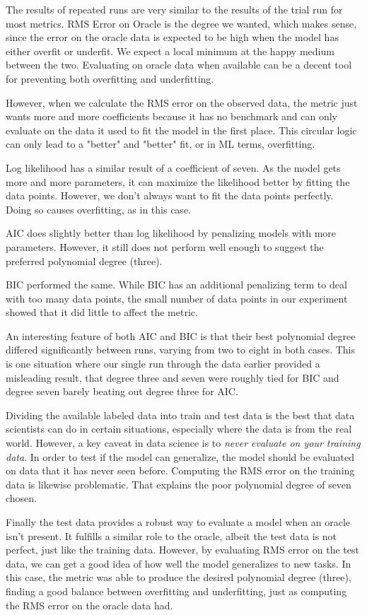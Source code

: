 \documentclass{article}
\begin{document}
The results of repeated runs are very similar to the results of the trial run
for most metrics. RMS Error on Oracle is the degree we wanted, which makes 
sense, since the error on the oracle data is expected to be high when the model 
has either overfit or underfit. We expect a local minimum at the happy medium 
between the two. Evaluating on oracle data when available can be a decent tool 
for preventing both overfitting and underfitting.

However, when we calculate the RMS error on the observed data, the metric just 
wants more and more coefficients because it has no benchmark and can only 
evaluate on the data it used to fit the model in the first place. This circular 
logic can only lead to a "better" and "better" fit, or in ML terms, overfitting.

Log likelihood has a similar result of a coefficient of seven. As the model 
gets more and more parameters, it can maximize the likelihood better by fitting 
the data points. However, we don't always want to fit the data points perfectly.
Doing so causes overfitting, as in this case.

AIC does slightly better than log likelihood by penalizing models with more 
parameters. However, it still does not perform well enough to suggest the 
preferred polynomial degree (three).

BIC performed the same. While BIC has an additional penalizing term to deal 
with too many data points, the small number of data points in our experiment 
showed that it did little to affect the metric.

An interesting feature of both AIC and BIC is that their best polynomial degree 
differed significantly between runs, varying from two to eight in both cases. 
This is one situation where our single run through the data earlier provided 
a misleading result, that degree three and seven were roughly tied for BIC and 
degree seven barely beating out degree three for AIC.

Dividing the available labeled data into train and test data is the best that 
data scientists can do in certain situations, especially where the data is 
from the real world. However, a key caveat in data science is to \textit{never 
evaluate on your training data}. In order to test if the model can generalize, 
the model should be evaluated on data that it has never seen before. Computing 
the RMS error on the training data is likewise problematic. That explains the 
poor polynomial degree of seven chosen.

Finally the test data provides a robust way to evaluate a model when an oracle 
isn't present. It fulfills a similar role to the oracle, albeit the test data 
is not perfect, just like the training data. However, by evaluating RMS error 
on the test data, we can get a good idea of how well the model generalizes to 
new tasks. In this case, the metric was able to produce the desired polynomial 
degree (three), finding a good balance between overfitting and underfitting, 
just as computing the RMS error on the oracle data had.
\end{document}
